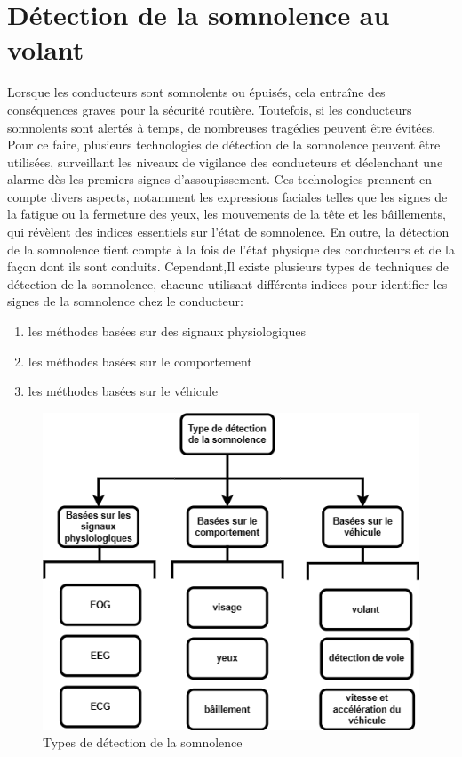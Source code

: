 \section{Détection de la somnolence au volant}
Lorsque les conducteurs sont somnolents ou épuisés, cela entraîne des conséquences graves pour la sécurité routière. Toutefois, si les conducteurs somnolents sont alertés à temps, de nombreuses tragédies peuvent être évitées. Pour ce faire, plusieurs technologies de détection de la somnolence peuvent être utilisées, surveillant les niveaux de vigilance des conducteurs et déclenchant une alarme dès les premiers signes d'assoupissement. Ces technologies prennent en compte divers aspects, notamment les expressions faciales telles que les signes de la fatigue ou la fermeture des yeux, les mouvements de la tête et les bâillements, qui révèlent des indices essentiels sur l'état de somnolence. En outre, la détection de la somnolence tient compte à la fois de l'état physique des conducteurs et de la façon dont ils sont conduits.
Cependant,Il existe plusieurs types de techniques de détection de la somnolence, chacune utilisant différents indices pour identifier les signes de la somnolence chez le conducteur:
\begin{enumerate}
    \item les méthodes basées sur des signaux physiologiques
    \item les méthodes basées sur le comportement 
    \item les méthodes basées sur le véhicule
\end{enumerate}
\begin{figure}[H]
    
    \includegraphics[]{img/indicateurs.drawio.png}
    \caption{ Types  de détection de la somnolence}
     \hypertarget{fig01}{}
\end{figure}
